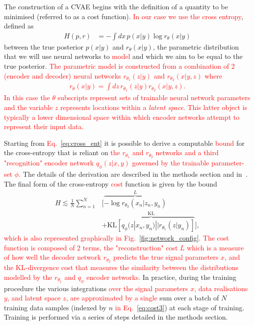 \documentclass[%
showpacs,
nofootinbib,
 amsmath,amssymb,
 aps,
 twocolumn,
 prl,
 reprint,
floatfix,
]{revtex4-1}
\newcommand{\new}[1]{\textcolor{red}{#1}}
\begin{document}
%
%
The construction of a \ac{CVAE} begins with the definition of a quantity to be
minimised (referred to as a cost function). \new{In our case we use the cross
entropy}, defined as
%
\begin{align}\label{eq:cross_ent} 
H(p,r) &= -\int dx\, p(x|y) \log r_{\theta}(x|y) 
\end{align}
%
between the true posterior $p(x|y)$ and $r_{\theta}(x|y)$, the parametric
distribution that we will use neural networks to \new{model} and which we aim
to be equal to the true posterior. \new{The parametric model is constructed from a
combination of 2 (encoder and decoder) neural networks $r_{\theta_1}(z|y)$ and
$r_{\theta_2}(x|y,z)$ where
%
\begin{align}\label{eq:latent_model}
r_{\theta}(x|y) = \int dz\,r_{\theta_1}(z|y)r_{\theta_2}(x|y,z).
\end{align}
%
In this case the $\theta$ subscripts represent sets of trainable neural
network parameters and the variable $z$ represents locations within a
\emph{latent space}. This latter object is typically a lower dimensional space
within which encoder networks attempt to represent their input data.}

Starting from \new{Eq.~\ref{eq:cross_ent}} it is possible to derive a
computable \new{bound} for the cross-entropy that is reliant on \new{the
$r_{\theta_1}$ and $r_{\theta_2}$ networks and a third "recognition" encoder network
$q_{\phi}(z|x,y)$ governed by the trainable parameter-set $\phi$.} The details
of the derivation are described in the methods section and
in~\cite{1904.06264}. The final form of the cross-entropy \new{cost} function is
given by the bound
%
\begin{align}\label{eq:cost3} H \lesssim
\frac{1}{N}\sum_{n=1}^{N}&\Big[\overbrace{-\log
r_{\theta_{2}}(x_{n}|z_{n},y_{n})}^{L}\nonumber\\
&+\overbrace{\text{KL}\left[q_{\phi}(z|x_{n},y_{n})||r_{\theta_{1}}(z|y_{n})\right]}^{\text{KL}}\Big],
\end{align}
%
\new{which is also represented graphically in Fig.~\ref{fig:network_config}. The cost
function is composed of 2 terms, the "reconstruction" cost $L$ which is a
measure of how well the decoder network $r_{\theta_2}$ predicts the true signal
parameters $x$, and the \ac{KL}-divergence cost that measures the similarity
between the distributions modelled by the $r_{\theta_1}$ and $q_{\phi}$ encoder
networks.} In practice, during the training procedure the various integrations
\new{over the signal parameters $x$, data realisations $y$, and latent space $z$,
are approximated by a single} sum over a batch of $N$ training data samples
(indexed by $n$ \new{in Eq.~\ref{eq:cost3}}) at each stage of training. Training is
performed via a series of steps detailed in the methods section.
\end{document}
